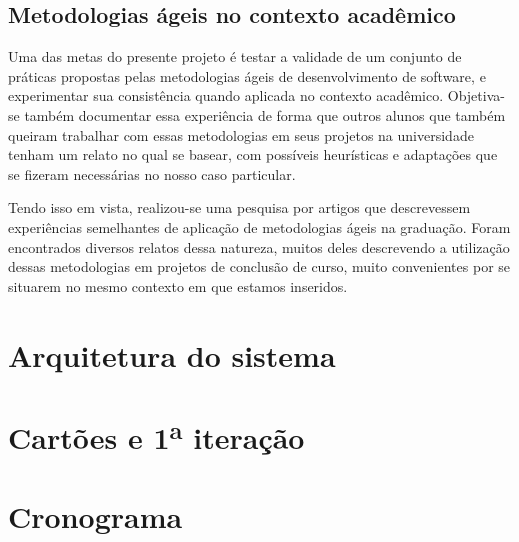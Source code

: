 \documentclass[a4paper,12pt,font=plain,header=plain]{abnt}
\begin{document}
    \subsection{Metodologias ágeis no contexto acadêmico}
      Uma das metas do presente projeto é testar a validade de um conjunto de práticas propostas pelas metodologias ágeis de desenvolvimento de software, e experimentar sua consistência quando aplicada no contexto acadêmico. Objetiva-se também documentar essa experiência de forma que outros alunos que também queiram trabalhar com essas metodologias em seus projetos na universidade tenham um relato no qual se basear, com possíveis heurísticas e adaptações que se fizeram necessárias no nosso caso particular.

      Tendo isso em vista, realizou-se uma pesquisa por artigos que descrevessem experiências semelhantes de aplicação de metodologias ágeis na graduação. Foram encontrados diversos relatos dessa natureza, muitos deles descrevendo a utilização dessas metodologias em projetos de conclusão de curso, muito convenientes por se situarem no mesmo contexto em que estamos inseridos.

  \section{Arquitetura do sistema}

  \section{Cartões e 1\textsuperscript{a} iteração}

  \section{Cronograma}
\end{document}
